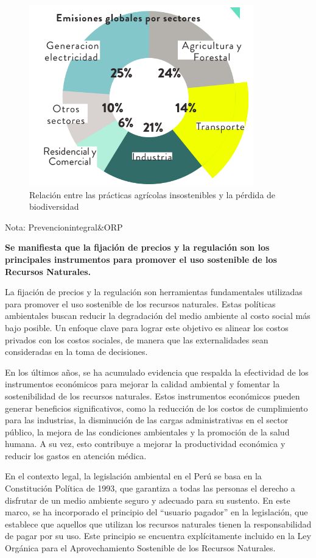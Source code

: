 \documentclass[
  letterpaper,
  DIV=11,
  numbers=noendperiod]{scrartcl}
\begin{document}
\begin{figure}

\caption{\label{fig-2}Relación entre las prácticas agrícolas
insostenibles y la pérdida de biodiversidad}

{\centering \includegraphics{20230603083843.png}

}

\end{figure}

Nota: Prevencionintegral\&ORP

\textbf{Se manifiesta que la fijación de precios y la regulación son los
principales instrumentos para promover el uso sostenible de los Recursos
Naturales.}

La fijación de precios y la regulación son herramientas fundamentales
utilizadas para promover el uso sostenible de los recursos naturales.
Estas políticas ambientales buscan reducir la degradación del medio
ambiente al costo social más bajo posible. Un enfoque clave para lograr
este objetivo es alinear los costos privados con los costos sociales, de
manera que las externalidades sean consideradas en la toma de
decisiones.

En los últimos años, se ha acumulado evidencia que respalda la
efectividad de los instrumentos económicos para mejorar la calidad
ambiental y fomentar la sostenibilidad de los recursos naturales. Estos
instrumentos económicos pueden generar beneficios significativos, como
la reducción de los costos de cumplimiento para las industrias, la
disminución de las cargas administrativas en el sector público, la
mejora de las condiciones ambientales y la promoción de la salud humana.
A su vez, esto contribuye a mejorar la productividad económica y reducir
los gastos en atención médica.

En el contexto legal, la legislación ambiental en el Perú se basa en la
Constitución Política de 1993, que garantiza a todas las personas el
derecho a disfrutar de un medio ambiente seguro y adecuado para su
sustento. En este marco, se ha incorporado el principio del ``usuario
pagador'' en la legislación, que establece que aquellos que utilizan los
recursos naturales tienen la responsabilidad de pagar por su uso. Este
principio se encuentra explícitamente incluido en la Ley Orgánica para
el Aprovechamiento Sostenible de los Recursos Naturales.
\end{document}
